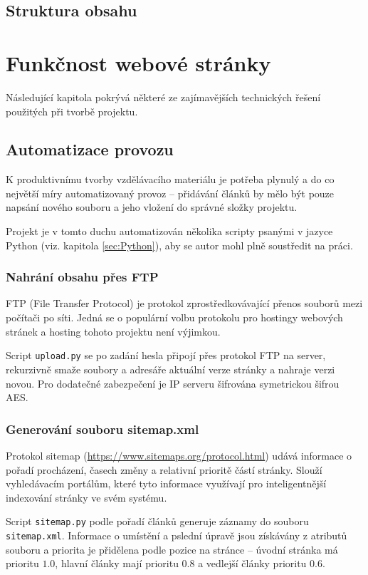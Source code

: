 \documentclass[a4paper, 12pt]{article}
\begin{document}
  \subsection{Struktura obsahu}

  \section{Funkčnost webové stránky}
  Následující kapitola pokrývá některé ze zajímavějších technických řešení použitých při tvorbě projektu.


  \subsection{Automatizace provozu} \label{sec:Automatizace provozu}
  K produktivnímu tvorby vzdělávacího materiálu je potřeba plynulý a do co největší míry automatizovaný provoz -- přidávání článků by mělo být pouze napsání nového souboru a jeho vložení do správné složky projektu.

  Projekt je v tomto duchu automatizován několika scripty psanými v jazyce Python (viz. kapitola \ref{sec:Python}), aby se autor mohl plně soustředit na práci.


  \subsubsection{Nahrání obsahu přes FTP}
  FTP (File Transfer Protocol) je protokol zprostředkovávající přenos souborů mezi počítači po síti. Jedná se o populární volbu protokolu pro hostingy webových stránek a hosting tohoto projektu není výjimkou.

  Script \texttt{upload.py} se po zadání hesla připojí přes protokol FTP na server, rekurzivně smaže soubory a adresáře aktuální verze stránky a nahraje verzi novou. Pro dodatečné zabezpečení je IP serveru šifrována symetrickou šifrou AES.


  \subsubsection{Generování souboru sitemap.xml}
  Protokol sitemap (\url{https://www.sitemaps.org/protocol.html}) udává informace o pořadí procházení, časech změny a relativní prioritě částí stránky. Slouží vyhledávacím portálům, které tyto informace využívají pro inteligentnější indexování stránky ve svém systému.

  Script \texttt{sitemap.py} podle pořadí článků generuje záznamy do souboru \texttt{sitemap.xml}. Informace o umístění a pslední úpravě jsou získávány z atributů souboru a priorita je přidělena podle pozice na stránce -- úvodní stránka má prioritu $1.0$, hlavní články mají prioritu $0.8$ a vedlejší články prioritu $0.6$.
\end{document}
